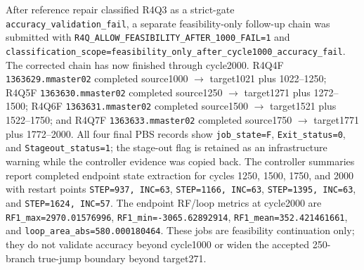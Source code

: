\documentclass[11pt,a4paper]{article}
\newcommand{\code}[1]{\texttt{#1}}
\begin{document}
After reference repair classified R4Q3 as a strict-gate \code{accuracy\_validation\_fail}, a separate feasibility-only follow-up chain was submitted with \code{R4Q\_ALLOW\_FEASIBILITY\_AFTER\_1000\_FAIL=1} and \code{classification\_scope=feasibility\_only\_after\_cycle1000\_accuracy\_fail}. The corrected chain has now finished through cycle2000. R4Q4F \code{1363629.mmaster02} completed source1000 \(\rightarrow\) target1021 plus 1022--1250; R4Q5F \code{1363630.mmaster02} completed source1250 \(\rightarrow\) target1271 plus 1272--1500; R4Q6F \code{1363631.mmaster02} completed source1500 \(\rightarrow\) target1521 plus 1522--1750; and R4Q7F \code{1363633.mmaster02} completed source1750 \(\rightarrow\) target1771 plus 1772--2000. All four final PBS records show \code{job\_state=F}, \code{Exit\_status=0}, and \code{Stageout\_status=1}; the stage-out flag is retained as an infrastructure warning while the controller evidence was copied back. The controller summaries report completed endpoint state extraction for cycles 1250, 1500, 1750, and 2000 with restart points \code{STEP=937, INC=63}, \code{STEP=1166, INC=63}, \code{STEP=1395, INC=63}, and \code{STEP=1624, INC=57}. The endpoint RF/loop metrics at cycle2000 are \code{RF1\_max=2970.01576996}, \code{RF1\_min=-3065.62892914}, \code{RF1\_mean=352.421461661}, and \code{loop\_area\_abs=580.000180464}. These jobs are feasibility continuation only; they do not validate accuracy beyond cycle1000 or widen the accepted 250-branch true-jump boundary beyond target271.
\end{document}

